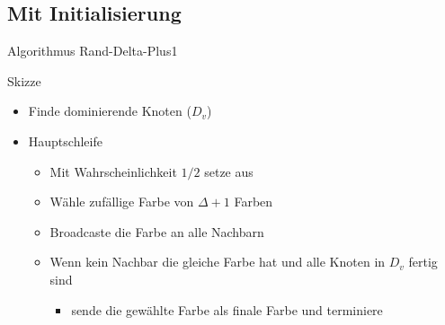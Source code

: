 \documentclass[18pt]{beamer}
\begin{document}
\subsection{Mit Initialisierung}
\begin{frame}{Algorithmus Rand-Delta-Plus1}
	\begin{exampleblock}{Skizze}
	  \begin{itemize}
			\item Finde dominierende Knoten ($D_v$)
			\pause
			\item Hauptschleife
			\pause
			\begin{itemize}
				\item Mit Wahrscheinlichkeit $1/2$ setze aus
			\pause
				\item Wähle zufällige Farbe von $\Delta+1$ Farben
			\pause
				\item Broadcaste die Farbe an alle Nachbarn
			\pause
				\item Wenn kein Nachbar die gleiche Farbe hat und alle Knoten in $D_v$ fertig sind
				\begin{itemize}
					\item sende die gewählte Farbe als finale Farbe und terminiere
				\end{itemize}
			\end{itemize}
		\end{itemize}
	\end{exampleblock}
\end{frame}
\end{document}

